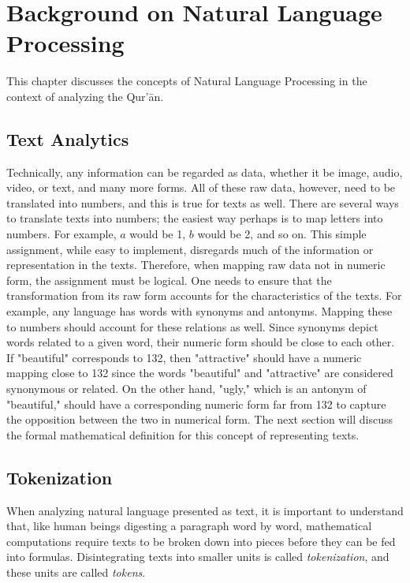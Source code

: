 \chapter{Background on Natural Language Processing}\label{ch:nlp}
This chapter discusses the concepts of Natural Language Processing in the context of analyzing the Qur'\=an.

\section{Text Analytics}
Technically, any information can be regarded as data, whether it be image, audio, video, or text, and many more forms. All of these raw data, however, need to be translated into numbers, and this is true for texts as well. There are several ways to translate texts into numbers; the easiest way perhaps is to map letters into numbers. For example, $a$ would be 1, $b$ would be 2, and so on. This simple assignment, while easy to implement, disregards much of the information or representation in the texts. Therefore, when mapping raw data not in numeric form, the assignment must be logical. One needs to ensure that the transformation from its raw form accounts for the characteristics of the texts. For example, any language has words with synonyms and antonyms. Mapping these to numbers should account for these relations as well. Since synonyms depict words related to a given word, their numeric form should be close to each other. If "beautiful" corresponds to 132, then "attractive" should have a numeric mapping close to 132 since the words "beautiful" and "attractive" are considered synonymous or related. On the other hand, "ugly," which is an antonym of "beautiful," should have a corresponding numeric form far from 132 to capture the opposition between the two in numerical form. The next section will discuss the formal mathematical definition for this concept of representing texts.

\section{Tokenization}\label{sec:text_tokenization}
When analyzing natural language presented as text, it is important to understand that, like human beings digesting a paragraph word by word, mathematical computations require texts to be broken down into pieces before they can be fed into formulas. Disintegrating texts into smaller units is called \textit{tokenization}, and these units are called \textit{tokens}.

